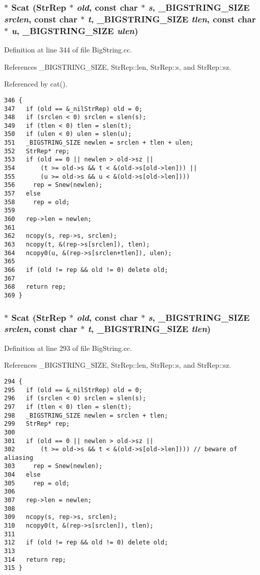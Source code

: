 \subsubsection{$\ast$ Scat ({\bf Str\-Rep} $\ast$ {\em old}, const char $\ast$ {\em s}, {\bf \_\-BIGSTRING\_\-SIZE} {\em srclen}, const char $\ast$ {\em t}, {\bf \_\-BIGSTRING\_\-SIZE} {\em tlen}, const char $\ast$ {\em u}, {\bf \_\-BIGSTRING\_\-SIZE} {\em ulen})}\label{BigString_8cc_a20}




Definition at line 344 of file Big\-String.cc.

References \_\-BIGSTRING\_\-SIZE, Str\-Rep::len, Str\-Rep::s, and Str\-Rep::sz.

Referenced by cat().



\footnotesize\begin{verbatim}346 {
347   if (old == &_nilStrRep) old = 0;
348   if (srclen < 0) srclen = slen(s);
349   if (tlen < 0) tlen = slen(t);
350   if (ulen < 0) ulen = slen(u);
351   _BIGSTRING_SIZE newlen = srclen + tlen + ulen;
352   StrRep* rep;
353   if (old == 0 || newlen > old->sz || 
354       (t >= old->s && t < &(old->s[old->len])) ||
355       (u >= old->s && u < &(old->s[old->len])))
356     rep = Snew(newlen);
357   else
358     rep = old;
359 
360   rep->len = newlen;
361 
362   ncopy(s, rep->s, srclen);
363   ncopy(t, &(rep->s[srclen]), tlen);
364   ncopy0(u, &(rep->s[srclen+tlen]), ulen);
365 
366   if (old != rep && old != 0) delete old;
367 
368   return rep;
369 }
\end{verbatim}\normalsize 
{}
\subsubsection{$\ast$ Scat ({\bf Str\-Rep} $\ast$ {\em old}, const char $\ast$ {\em s}, {\bf \_\-BIGSTRING\_\-SIZE} {\em srclen}, const char $\ast$ {\em t}, {\bf \_\-BIGSTRING\_\-SIZE} {\em tlen})}\label{BigString_8cc_a19}




Definition at line 293 of file Big\-String.cc.

References \_\-BIGSTRING\_\-SIZE, Str\-Rep::len, Str\-Rep::s, and Str\-Rep::sz.



\footnotesize\begin{verbatim}294 {
295   if (old == &_nilStrRep) old = 0;
296   if (srclen < 0) srclen = slen(s);
297   if (tlen < 0) tlen = slen(t);
298   _BIGSTRING_SIZE newlen = srclen + tlen;
299   StrRep* rep;
300 
301   if (old == 0 || newlen > old->sz || 
302       (t >= old->s && t < &(old->s[old->len]))) // beware of aliasing
303     rep = Snew(newlen);
304   else
305     rep = old;
306 
307   rep->len = newlen;
308 
309   ncopy(s, rep->s, srclen);
310   ncopy0(t, &(rep->s[srclen]), tlen);
311 
312   if (old != rep && old != 0) delete old;
313 
314   return rep;
315 }
\end{verbatim}\normalsize 
{}
